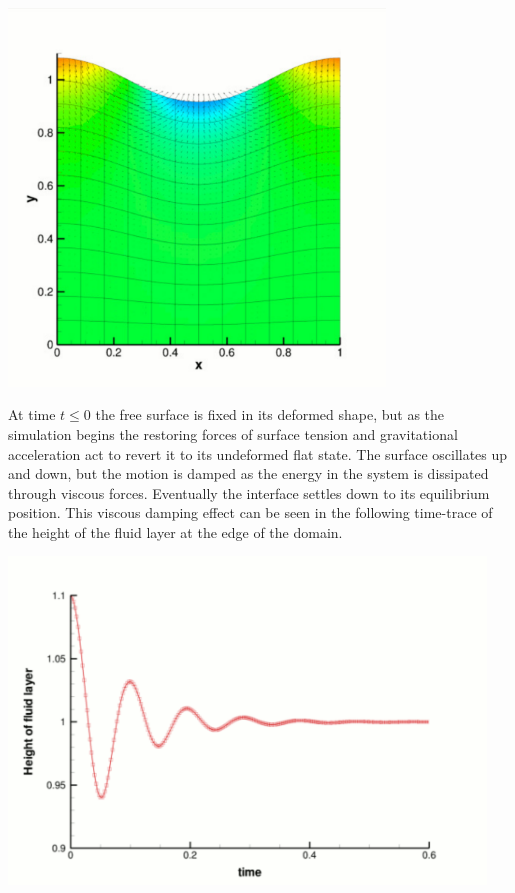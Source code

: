  
\begin{DoxyImage}
\includegraphics[width=0.75\textwidth]{single_layer}
\end{DoxyImage}


At time $ t \leq 0 $ the free surface is fixed in its deformed shape, but as the simulation begins the restoring forces of surface tension and gravitational acceleration act to revert it to its undeformed flat state. The surface oscillates up and down, but the motion is damped as the energy in the system is dissipated through viscous forces. Eventually the interface settles down to its equilibrium position. This viscous damping effect can be seen in the following time-\/trace of the height of the fluid layer at the edge of the domain.

 
\begin{DoxyImage}
\includegraphics[width=0.95\textwidth]{single_layer_trace}
\end{DoxyImage}




